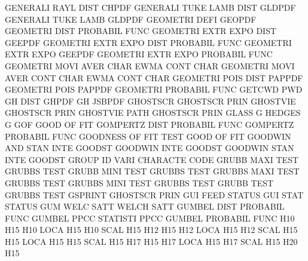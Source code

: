 GENERALI RAYL DIST                      CHPDF
GENERALI TUKE LAMB DIST                 GLDPDF
GENERALI TUKE LAMB                      GLDPDF
GEOMETRI DEFI                           GEOPDF
GEOMETRI DIST                           PROBABIL FUNC
GEOMETRI EXTR EXPO DIST                 GEEPDF
GEOMETRI EXTR EXPO DIST                 PROBABIL FUNC
GEOMETRI EXTR EXPO                      GEEPDF
GEOMETRI EXTR EXPO                      PROBABIL FUNC
GEOMETRI MOVI AVER CHAR                 EWMA     CONT CHAR
GEOMETRI MOVI AVER CONT CHAR            EWMA     CONT CHAR
GEOMETRI POIS DIST                      PAPPDF
GEOMETRI POIS                           PAPPDF
GEOMETRI                                PROBABIL FUNC
GETCWD                                  PWD
GH       DIST                           GHPDF
GH                                      JSBPDF
GHOSTSCR                                GHOSTSCR PRIN
GHOSTVIE                                GHOSTSCR PRIN
GHOSTVIE PATH                           GHOSTSCR PRIN
GLASS    G                              HEDGES   G
GOF                                     GOOD     OF   FIT
GOMPERTZ DIST                           PROBABIL FUNC
GOMPERTZ                                PROBABIL FUNC
GOODNESS OF   FIT  TEST                 GOOD     OF   FIT
GOODWIN  AND  STAN INTE                 GOODST
GOODWIN  INTE                           GOODST
GOODWIN  STAN INTE                      GOODST
GROUP    ID   VARI                      CHARACTE CODE
GRUBB    MAXI TEST                      GRUBBS   TEST
GRUBB    MINI TEST                      GRUBBS   TEST
GRUBBS   MAXI TEST                      GRUBBS   TEST
GRUBBS   MINI TEST                      GRUBBS   TEST
GRUBB    TEST                           GRUBBS   TEST
GSPRINT                                 GHOSTSCR PRIN
GUI      FEED                           STATUS
GUI      STAT                           STATUS
GUM      WELC SATT                      WELCH    SATT
GUMBEL   DIST                           PROBABIL FUNC
GUMBEL   PPCC                           STATISTI PPCC
GUMBEL                                  PROBABIL FUNC
H10                                     H15
H10      LOCA                           H15
H10      SCAL                           H15
H12                                     H15
H12      LOCA                           H15
H12      SCAL                           H15
H15      LOCA                           H15
H15      SCAL                           H15
H17                                     H15
H17      LOCA                           H15
H17      SCAL                           H15
H20                                     H15
